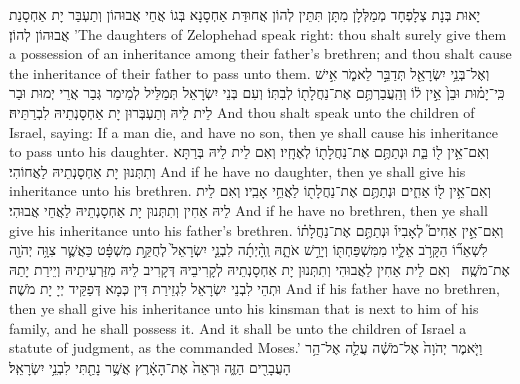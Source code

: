 {יָאוּת בְּנָת צְלָפְחָד מְמַלְּלָן מִתָּן תִּתֵּין לְהוֹן אֲחוּדַּת אַחְסָנָא בְּגוֹ אֲחֵי אֲבוּהוֹן וְתַעְבַּר יָת אַחְסָנַת אֲבוּהוֹן לְהוֹן׃}
{’The daughters of Zelophehad speak right: thou shalt surely give them a possession of an inheritance among their father’s brethren; and thou shalt cause the inheritance of their father to pass unto them.}{}
{וְאֶל־בְּנֵ֥י יִשְׂרָאֵ֖ל תְּדַבֵּ֣ר לֵאמֹ֑ר אִ֣ישׁ כִּֽי־יָמ֗וּת וּבֵן֙ אֵ֣ין ל֔וֹ וְהַֽעֲבַרְתֶּ֥ם אֶת־נַחֲלָת֖וֹ לְבִתּֽוֹ׃}
{וְעִם בְּנֵי יִשְׂרָאֵל תְּמַלֵּיל לְמֵימַר גְּבַר אֲרֵי יְמוּת וּבַר לֵית לֵיהּ וְתַעְבְּרוּן יָת אַחְסָנְתֵיהּ לִבְרַתֵּיהּ׃}
{And thou shalt speak unto the children of Israel, saying: If a man die, and have no son, then ye shall cause his inheritance to pass unto his daughter.}{}
{וְאִם־אֵ֥ין ל֖וֹ בַּ֑ת וּנְתַתֶּ֥ם אֶת־נַחֲלָת֖וֹ לְאֶחָֽיו׃}
{וְאִם לֵית לֵיהּ בְּרַתָּא וְתִתְּנוּן יָת אַחְסָנְתֵיהּ לַאֲחוֹהִי׃}
{And if he have no daughter, then ye shall give his inheritance unto his brethren.}{}
{וְאִם־אֵ֥ין ל֖וֹ אַחִ֑ים וּנְתַתֶּ֥ם אֶת־נַחֲלָת֖וֹ לַאֲחֵ֥י אָבִֽיו׃}
{וְאִם לֵית לֵיהּ אַחִין וְתִתְּנוּן יָת אַחְסָנְתֵיהּ לַאֲחֵי אֲבוּהִי׃}
{And if he have no brethren, then ye shall give his inheritance unto his father’s brethren.}{}
{וְאִם־אֵ֣ין אַחִים֮ לְאָבִיו֒ וּנְתַתֶּ֣ם אֶת־נַחֲלָת֗וֹ לִשְׁאֵר֞וֹ הַקָּרֹ֥ב אֵלָ֛יו מִמִּשְׁפַּחְתּ֖וֹ וְיָרַ֣שׁ אֹתָ֑הּ וְֽהָ֨יְתָ֜ה לִבְנֵ֤י יִשְׂרָאֵל֙ לְחֻקַּ֣ת מִשְׁפָּ֔ט כַּאֲשֶׁ֛ר צִוָּ֥ה יְהֹוָ֖ה אֶת־מֹשֶֽׁה׃ \petucha 
{}}
{וְאִם לֵית אַחִין לַאֲבוּהִי וְתִתְּנוּן יָת אַחְסָנְתֵיהּ לְקָרִיבֵיהּ דְּקָרִיב לֵיהּ מִזַּרְעִיתֵיהּ וְיֵירַת יָתַהּ וּתְהֵי לִבְנֵי יִשְׂרָאֵל לִגְזֵירַת דִּין כְּמָא דְּפַקֵּיד יְיָ יָת מֹשֶׁה׃}
{And if his father have no brethren, then ye shall give his inheritance unto his kinsman that is next to him of his family, and he shall possess it. And it shall be unto the children of Israel a statute of judgment, as the \lord\space commanded Moses.’}{}
{וַיֹּ֤אמֶר יְהֹוָה֙ אֶל־מֹשֶׁ֔ה עֲלֵ֛ה אֶל־הַ֥ר הָעֲבָרִ֖ים הַזֶּ֑ה וּרְאֵה֙ אֶת־הָאָ֔רֶץ אֲשֶׁ֥ר נָתַ֖תִּי לִבְנֵ֥י יִשְׂרָאֵֽל׃
}
